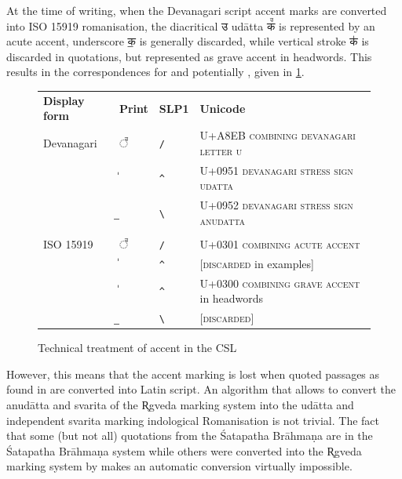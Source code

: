 At the time of writing, when the Devanagari script accent marks are converted into ISO 15919 romanisation, the diacritical {\devfont उ} udātta {\devfont क꣫} is represented by an acute accent, underscore {\devfont क॒} is generally discarded, while vertical stroke {\devfont क॑} is discarded in quotations, but represented as grave accent in headwords. This results in the correspondences for \citet{pwg} and potentially \citet{pw}, given in \ref{tab:csl1}.


\begin{figure}[!ht]
\begin{center}
\begingroup
\setlength{\tabcolsep}{10pt} %
\renewcommand{\arraystretch}{1.5} %
\begin{tabular}{llll}
\bfseries{Display form} & \bfseries{Print} & \bfseries{SLP1} & \bfseries{Unicode}\\
Devanagari & {\devfont ◌꣫} & \texttt{{/}} & U+A8EB \textsc{combining devanagari letter u}\\
& {\devfont	॑}& \texttt{{\textasciicircum}} & U+0951 \textsc{devanagari stress sign udatta}\\
& {\devfont	॒} & \texttt{{\textbackslash}}& U+0952 \textsc{devanagari stress sign anudatta}\\
&&&\\
ISO 15919 & {\devfont ◌꣫} & \texttt{{/}} & U+0301 \textsc{combining acute accent}\\
 & {\devfont	॑} & \texttt{{\textasciicircum}} & [\textsc{discarded} in examples]\\
 & {\devfont	॑} & \texttt{{\textasciicircum}} & U+0300 \textsc{combining grave accent} in headwords\\
 & {\devfont	॒} & \texttt{{\textbackslash}} & [\textsc{discarded}]\\
\end{tabular}
\endgroup
\end{center}
\caption[Technical treatment of accent in the CSL]{\label{tab:csl1}Technical treatment of accent in the CSL}
\end{figure}


However, this means that the accent marking is lost when quoted passages as found in \citet{pwg} are converted into Latin script. An algorithm that allows to convert the anudātta and svarita of the R̥gveda marking system into the udātta and independent svarita marking indological Romanisation is not trivial. The fact that some (but not all) quotations from the Śatapatha Brāhmaṇa are in the Śatapatha Brāhmaṇa system while others were converted into the R̥gveda marking system by \citet{pwg} makes an automatic conversion virtually impossible.

